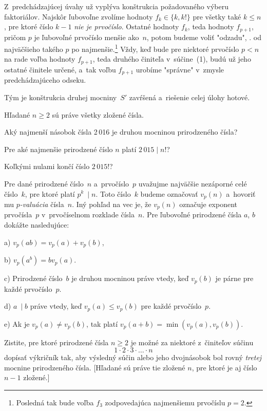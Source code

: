 {Z~predchádzajúcej úvahy už vyplýva konštrukcia požadovaného výberu
faktoriálov. Najskôr ľubovoľne zvolíme hodnoty $f_k\in\{k,k!\}$ pre
všetky také $k\le n$, pre ktoré číslo $k-1$ {\it nie je
prvočíslo}. Ostatné hodnoty $f_k$, teda hodnoty $f_{p+1}$, pričom $p$
je ľubovoľné prvočíslo menšie ako~$n$, potom budeme voliť
"odzadu", \tj. od najväčšieho takého $p$ po
najmenšie.\footnote{Posledná tak bude voľba $f_3$ zodpovedajúca
najmenšiemu prvočíslu $p=2$.} Vždy, keď bude pre niektoré
prvočíslo $p<n$ na rade voľba hodnoty $f_{p+1}$,
teda druhého činiteľa v~súčine~(1), budú už jeho ostatné
činitele určené, a~tak voľbu $f_{p+1}$ urobíme "správne" v~zmysle predchádzajúceho odseku.

Tým je konštrukcia druhej mocniny~$S'$ zavŕšená a~riešenie celej
úlohy hotové.

\odpoved
Hľadané $n\ge2$ sú práve všetky zložené čísla.




Aký najmenší násobok čísla 2\,016 je druhou mocninou prirodzeného
čísla?

Pre aké najmenšie prirodzené číslo $n$ platí $2\,015 \mid n!$?

Koľkými nulami končí číslo $2\,015!$?

Pre dané prirodzené číslo~$n$ a~prvočíslo~$p$ uvažujme najväčšie nezáporné
celé číslo~$k$, pre ktoré platí $p^k~\mid n$. Toto číslo~$k$ budeme
označovať $v_p(n)$ a~hovoriť mu {\it $p$-valuácia\/} čísla~$n$. Iný pohľad na vec
je, že $v_p(n)$ označuje exponent prvočísla~$p$ v~prvočíselnom rozklade
čísla~$n$. Pre ľubovoľné prirodzené čísla $a$, $b$ dokážte nasledujúce:
\item{a)} $v_p(ab) = v_p(a) + v_p(b)$,
\item{b)} $v_p(a^b) = bv_p(a)$.
\item{c)} Prirodzené číslo~$b$ je druhou mocninou práve vtedy, keď $v_p(b)$
je párne pre každé prvočíslo~$p$.
\item{d)} $a~\mid b$ práve vtedy, keď $v_p(a) \le v_p(b)$ pre každé prvočíslo~$p$.
\item{e)} Ak je $v_p(a) \ne v_p(b)$, tak platí $v_p(a+b) = \min(v_p(a),
v_p(b))$.

\D
Zistite, pre ktoré prirodzené
čísla $n \ge 2$ je možné za niektoré z~činiteľov súčinu
$$1 \cdot 2\cdot {3\cdot \dots \cdot n}$$
dopísať výkričník tak, aby
výsledný súčin alebo jeho dvojnásobok bol rovný {\it tretej\/}
mocnine prirodzeného čísla. [Hľadané sú práve tie zložené $n$,
pre ktoré je aj číslo $n-1$ zložené.]

}

